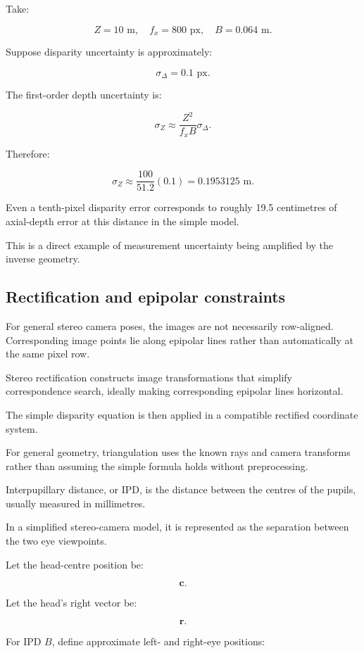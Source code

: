 Take:

\[ Z=10\text{ m},\quad f_x=800\text{ px},\quad B=0.064\text{ m}. \]

Suppose disparity uncertainty is approximately:

\[ \sigma_\Delta=0.1\text{ px}. \]

The first-order depth uncertainty is:

\[ \sigma_Z\approx \frac{Z^2}{f_xB}\sigma_\Delta. \]

Therefore:

\[ \sigma_Z\approx \frac{100}{51.2}(0.1) =\boxed{0.1953125\text{ m}}. \]

Even a tenth-pixel disparity error corresponds to roughly 19.5 centimetres of axial-depth error at this distance in the simple model.

This is a direct example of measurement uncertainty being amplified by the inverse geometry.

\subsection{Rectification and epipolar constraints}\label{02-foundations-ii-ch035-rectification-and-epipolar-constraints}

For general stereo camera poses, the images are not necessarily row-aligned. Corresponding image points lie along epipolar lines rather than automatically at the same pixel row.

Stereo rectification constructs image transformations that simplify correspondence search, ideally making corresponding epipolar lines horizontal.

The simple disparity equation is then applied in a compatible rectified coordinate system.

For general geometry, triangulation uses the known rays and camera transforms rather than assuming the simple formula holds without preprocessing.

Interpupillary distance, or IPD, is the distance between the centres of the pupils, usually measured in millimetres.

In a simplified stereo-camera model, it is represented as the separation between the two eye viewpoints.

Let the head-centre position be:

\[ \mathbf c. \]

Let the head's right vector be:

\[ \mathbf r. \]

For IPD \(B\), define approximate left- and right-eye positions:

